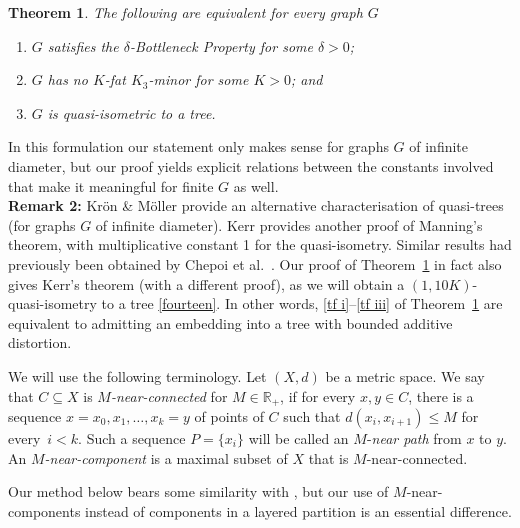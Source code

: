 \documentclass[a4paper]{article}
\newcommand{\defi}[1]{{\color{darkgray}\emph{#1}}}
\newtheorem{theorem}[proposition]{Theorem}
\newcommand{\R}{\ensuremath{\mathbb R}}
\newcommand{\Tr}[1]{Theorem~\ref{#1}}
\newcommand{\fe}{for every}
\newcommand{\ncm}{near-component}
\begin{document}
\begin{theorem} \label{triangle-free}
The following are equivalent for every graph $G$
\begin{enumerate}
\item \label{tf i} $G$ satisfies the $\delta$-Bottleneck Property for some $\delta>0$;
\item \label{tf ii} $G$ has no $K$-fat $K_3$-minor for some $K>0$; and
\item \label{tf iii} $G$ is quasi-isometric to a tree.
\end{enumerate}
\end{theorem}
 In this formulation our statement only makes sense for graphs $G$ of infinite diameter, but our proof yields explicit relations between the constants involved that make it meaningful for finite $G$ as well. \\
{\bf Remark 2:} Kr\"on \& M\"oller \cite{KroMolQua} provide an alternative characterisation of quasi-trees (for graphs $G$ of infinite diameter). Kerr \cite{KerTre} provides another proof of Manning's theorem, with multiplicative constant 1 for the quasi-isometry. Similar results had previously been obtained by Chepoi et al.\ \cite{CDNRV}. Our proof of \Tr{triangle-free} in fact also gives Kerr's theorem (with a different proof), as we will obtain a $(1,10K)$-quasi-isometry to a tree \eqref{fourteen}.  In other words, \ref{tf i}--\ref{tf iii} of \Tr{triangle-free} are equivalent to admitting an embedding into a tree with bounded additive distortion. 

\medskip
We will use the following terminology. Let $(X,d)$ be a metric space. We say that $C\subseteq X$ is \defi{$M$-near-connected} for $M\in \R_+$, if for every $x,y\in C$, there is a sequence $x=x_0,x_1, \ldots, x_k=y$ of points of $C$ such that $d(x_i,x_{i+1})\leq M$ \fe\ $i<k$. Such a sequence $P=\{x_i\}$ will be called an $M$-\defi{near path} from $x$ to $y$. An \defi{$M$-\ncm} is a maximal subset of $X$ that is $M$-near-connected. 

Our method below bears some similarity with \cite{CDNRV}, but our use of $M$-\ncm s instead of components in a layered partition is an essential difference. 
\end{document}
